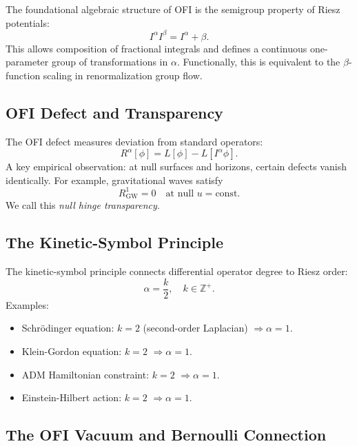 \documentclass[12pt,a4paper]{article}
\theoremstyle{definition}
\newcommand{\Ialpha}{I^{\alpha}}
\newcommand{\Ibeta}{I^{\beta}}
\newcommand{\defect}[1]{R^{#1}}
\begin{document}
The foundational algebraic structure of OFI is the semigroup property of Riesz potentials:
\begin{equation}
\Ialpha \Ibeta = \Ialpha+\beta.
\end{equation}
This allows composition of fractional integrals and defines a continuous one-parameter group of transformations in $\alpha$. Functionally, this is equivalent to the $\beta$-function scaling in renormalization group flow.

\subsection{OFI Defect and Transparency}

The OFI defect measures deviation from standard operators:
\begin{equation}
\defect{\alpha}[\phi] = L[\phi] - L[\Ialpha \phi].
\end{equation}
A key empirical observation: at null surfaces and horizons, certain defects vanish identically. For example, gravitational waves satisfy
\begin{equation}
\defect{1}_{\text{GW}} = 0 \quad \text{at null } u = \text{const}.
\end{equation}
We call this \textit{null hinge transparency}.

\subsection{The Kinetic-Symbol Principle}

The kinetic-symbol principle connects differential operator degree to Riesz order:
\begin{equation}
\alpha = \frac{k}{2}, \quad k \in \mathbb{Z}^+.
\end{equation}
Examples:
\begin{itemize}
\item Schrödinger equation: $k=2$ (second-order Laplacian) $\Rightarrow \alpha=1$.
\item Klein-Gordon equation: $k=2$ $\Rightarrow \alpha=1$.
\item ADM Hamiltonian constraint: $k=2$ $\Rightarrow \alpha=1$.
\item Einstein-Hilbert action: $k=2$ $\Rightarrow \alpha=1$.
\end{itemize}

\subsection{The OFI Vacuum and Bernoulli Connection}
\end{document}
